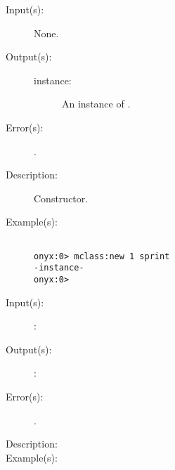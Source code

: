 \begin{description}
\label{mclass:new}
\item[{\onyxop{--}{new}{instance}}: ]
	\begin{description}\item[]
	\item[Input(s): ] None.
	\item[Output(s): ]
		\begin{description}\item[]
		\item[instance: ]
			An instance of .
		\end{description}
	\item[Error(s): ]
		\begin{description}\item[]
		\item[.]
		\end{description}
	\item[Description: ]
		Constructor.
	\item[Example(s): ]\begin{verbatim}

onyx:0> mclass:new 1 sprint
-instance-
onyx:0>
		\end{verbatim}
	\end{description}
\label{mclass:XXX}
\item[{\onyxop{METHODINS}{XXX}{METHODOUTS}}: ]
	\begin{description}\item[]
	\item[Input(s): ]
		\begin{description}\item[]
		\item[: ]
		\end{description}
	\item[Output(s): ]
		\begin{description}\item[]
		\item[: ]
		\end{description}
	\item[Error(s): ]
		\begin{description}\item[]
		\item[.]
		\end{description}
	\item[Description: ]
	\item[Example(s): ]\begin{verbatim}

		\end{verbatim}
	\end{description}
\end{description}
